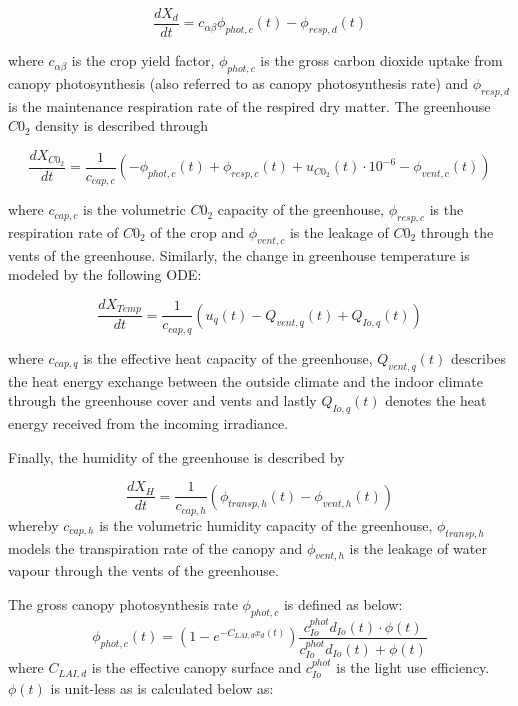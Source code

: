 \begin{equation}
	\frac{dX_d}{dt} = c_{\alpha \beta} \phi_{phot,c}(t) - \phi_{resp,d}(t)
\end{equation}

where $c_{\alpha \beta}$ is the crop yield factor, $\phi_{phot,c}$ is the gross carbon dioxide uptake from canopy photosynthesis (also referred to as canopy photosynthesis rate) and $\phi_{resp,d}$ is the maintenance respiration rate of the respired dry matter. 
The greenhouse $C0_2$ density is described through

\begin{equation}
	\frac{dX_{C0_2}}{dt} = \frac{1}{c_{cap,c}}(-\phi_{phot,c}(t) + \phi_{resp,c}(t) + u_{C0_2}(t) \cdot 10^{-6} - \phi_{vent,c}(t))
\end{equation}

where $c_{cap,c}$ is the volumetric $C0_2$ capacity of the greenhouse, $\phi_{resp,c}$ is the respiration rate of $C0_2$ of the crop and $\phi_{vent,c}$ is the  leakage of $C0_2$ through the vents of the greenhouse. Similarly, the change in greenhouse temperature is modeled by the following ODE:

\begin{equation}
	\frac{dX_{Temp}}{dt} = \frac{1}{c_{cap,q}}(u_{q}(t) - Q_{vent,q}(t) + Q_{Io,q}(t))
\end{equation}

where $c_{cap,q}$ is the effective heat capacity of the greenhouse, $Q_{vent,q}(t)$ describes the heat energy exchange between the outside climate and the indoor climate through the greenhouse cover and vents and lastly $Q_{Io,q}(t)$ denotes the heat energy received from the incoming irradiance.

Finally, the humidity of the greenhouse is described by

\begin{equation}
	\frac{dX_{H}}{dt} = \frac{1}{c_{cap,h}}(\phi_{transp,h}(t) - \phi_{vent,h}(t))
\end{equation}
whereby $c_{cap,h}$ is the volumetric humidity capacity of the greenhouse, $\phi_{transp,h}$ models the transpiration rate of the canopy and $\phi_{vent,h}$ is the leakage of water vapour through the vents of the greenhouse.

The gross canopy photosynthesis rate $\phi_{phot,c}$ is defined as below:
\begin{equation}
	\phi_{phot,c}(t) = (1 - e^{-C_{LAI,d} x_d(t)}) \frac{c_{Io}^{phot} d_{Io}(t) \cdot \phi(t)}{c_{Io}^{phot} d_{Io}(t) +\phi(t)}
	\label{eq: canopy photosynthesis rate}
\end{equation}
where $C_{LAI,d}$ is the effective canopy surface and $c_{Io}^{phot}$ is the light use efficiency. $\phi(t)$ is unit-less as is calculated below as:


